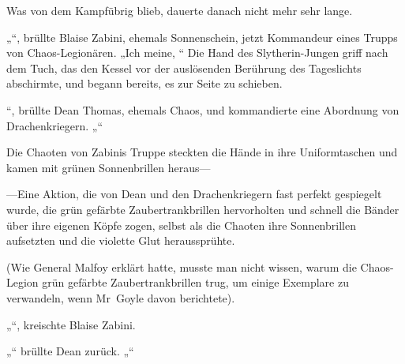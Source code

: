 Was von dem Kampfübrig blieb, dauerte danach nicht mehr sehr lange.

\later

„“, brüllte Blaise Zabini, ehemals Sonnenschein, jetzt Kommandeur eines Trupps von Chaos-Legionären. „Ich meine, “ Die Hand des Slytherin-Jungen griff nach dem Tuch, das den Kessel vor der auslösenden Berührung des Tageslichts abschirmte, und begann bereits, es zur Seite zu schieben.

“, brüllte Dean Thomas, ehemals Chaos, und kommandierte eine Abordnung von Drachenkriegern. „“

Die Chaoten von Zabinis Truppe steckten die Hände in ihre Uniformtaschen und kamen mit grünen Sonnenbrillen heraus—

—Eine Aktion, die von Dean und den Drachenkriegern fast perfekt gespiegelt wurde, die grün gefärbte Zaubertrankbrillen hervorholten und schnell die Bänder über ihre eigenen Köpfe zogen, selbst als die Chaoten ihre Sonnenbrillen aufsetzten und die violette Glut heraussprühte.

(Wie General Malfoy erklärt hatte, musste man nicht wissen, warum die Chaos-Legion grün gefärbte Zaubertrankbrillen trug, um einige Exemplare zu verwandeln, wenn Mr~Goyle davon berichtete).

„“, kreischte Blaise Zabini.

„“ brüllte Dean zurück. „“

